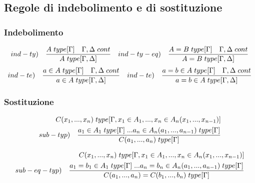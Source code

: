 \documentclass[10pt,a4paper, italian]{book}
\begin{document}
{{\subsection{Regole di indebolimento e di sostituzione}
\label{subsec:indebolimento-sostituzione}
\subsubsection{Indebolimento}
\label{subsec:indebolimento}
\[ ind-ty) \quad \frac{A\hspace{0.1cm}type[\Gamma] \quad \Gamma,\Delta\hspace{0.1cm}cont}{A\hspace{0.1cm}type[\Gamma,\Delta]} \quad ind-ty-eq) \quad \frac{A=B\hspace{0.1cm}type[\Gamma] \quad \Gamma,\Delta\hspace{0.1cm}cont}{A=B\hspace{0.1cm}type[\Gamma,\Delta]} \]
\[ ind-te) \quad \frac{a \in A\hspace{0.1cm}type[\Gamma] \quad \Gamma,\Delta\hspace{0.1cm}cont}{a \in A\hspace{0.1cm}type[\Gamma,\Delta]} \quad ind-te) \quad \frac{a=b \in A\hspace{0.1cm}type[\Gamma] \quad \Gamma,\Delta\hspace{0.1cm}cont}{a=b \in A\hspace{0.1cm}type[\Gamma,\Delta]} \]
\subsubsection{Sostituzione}
\label{subsec:sostituzione}
\begin{equation}
\begin{split}
C(x_1,...,x_n)\hspace{0.1cm}type[\Gamma, x_1 \in A_1,...,x_n \in A_n(x_1,...,x_{n-1})] \\ sub-typ) \quad \frac{a_1 \in A_1\hspace{0.1cm}type[\Gamma]\hspace{0.1cm}...a_n \in A_n(a_1,...,a_{n-1})\hspace{0.1cm}type[\Gamma]}{ C(a_1,...,a_n)\hspace{0.1cm}type[\Gamma]}
\end{split}
\end{equation}

\begin{equation}
\begin{split}
C(x_1,...,x_n)\hspace{0.1cm}type[\Gamma, x_1 \in A_1,...,x_n \in A_n(x_1,...,x_{n-1})] \\ sub-eq-typ) \quad \frac{a_1 = b_1  \in A_1\hspace{0.1cm}type[\Gamma]\hspace{0.1cm}...a_n = b_n \in A_n(a_1,...,a_{n-1})\hspace{0.1cm}type[\Gamma]}{ C(a_1,...,a_n) = C(b_1,...,b_n) \hspace{0.1cm}type[\Gamma]}
\end{split}
\end{equation}

}}
\end{document}
